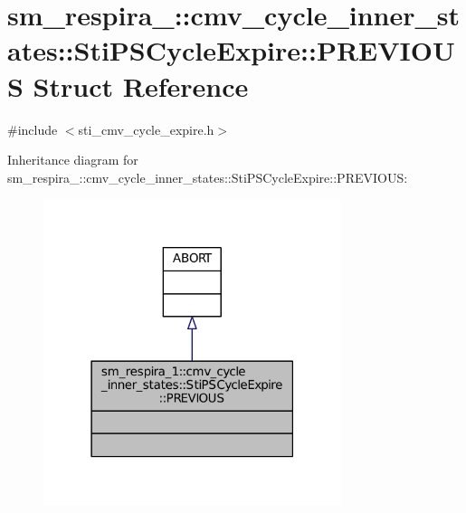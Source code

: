 \hypertarget{structsm__respira__1_1_1cmv__cycle__inner__states_1_1StiPSCycleExpire_1_1PREVIOUS}{}\section{sm\+\_\+respira\+\_\+:\+:cmv\+\_\+cycle\+\_\+inner\+\_\+states\+:\+:Sti\+P\+S\+Cycle\+Expire\+:\+:P\+R\+E\+V\+I\+O\+US Struct Reference}
\label{structsm__respira__1_1_1cmv__cycle__inner__states_1_1StiPSCycleExpire_1_1PREVIOUS}


{\ttfamily \#include $<$sti\+\_\+cmv\+\_\+cycle\+\_\+expire.\+h$>$}



Inheritance diagram for sm\+\_\+respira\+\_\+:\+:cmv\+\_\+cycle\+\_\+inner\+\_\+states\+:\+:Sti\+P\+S\+Cycle\+Expire\+:\+:P\+R\+E\+V\+I\+O\+US\+:
\nopagebreak
\begin{figure}[H]
\begin{center}
\leavevmode
\includegraphics[width=247pt]{structsm__respira__1_1_1cmv__cycle__inner__states_1_1StiPSCycleExpire_1_1PREVIOUS__inherit__graph}
\end{center}
\end{figure}


